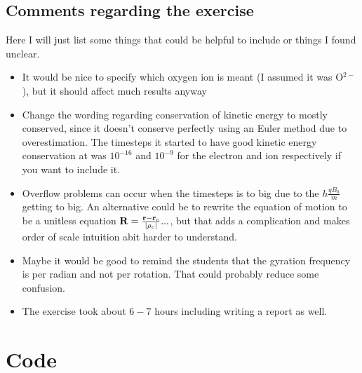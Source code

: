 \documentclass[x11names]{article}
\begin{document}
\subsection{Comments regarding the exercise}
      Here I will just list some things that could be helpful to include or things I found unclear.

      \begin{itemize}
            \item It would be nice to specify which oxygen ion is meant (I assumed it was O\(^{2-}\)), but it should affect much results anyway
            \item Change the wording regarding conservation of kinetic energy to mostly conserved, since it doesn't conserve perfectly using an Euler method due to overestimation. The timesteps it started to have good kinetic energy conservation at was \(10^{-16}\) and \( 10^{-9} \) for the electron and ion respectively if you want to include it.
            \item Overflow problems can occur when the timesteps is to big due to the \(  h\frac{qB_0}{m}  \) getting to big. An alternative could be to rewrite the equation of motion to be a unitless equation 
            \( \vb{R} = \frac{\vb{r}-\vb{r}_c}{|\rho_c|}... \), but that adds a complication and makes order of scale intuition abit harder to understand.
            \item Maybe it would be good to remind the students that the gyration frequency is per radian and not per rotation. That could probably reduce some confusion.
            \item The exercise took about $6-7$ hours including writing a report as well.
      \end{itemize}

\appendix
\section{Code}
      

      
\end{document}
